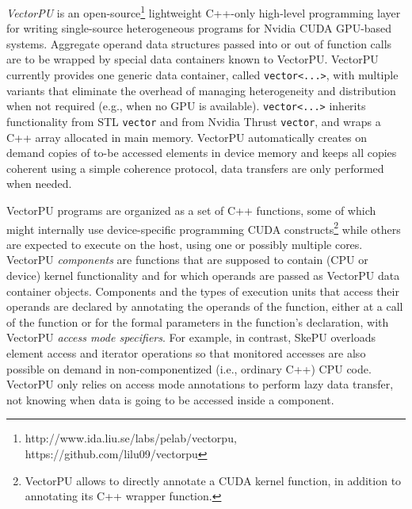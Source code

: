 \textit{VectorPU} \cite{VectorPU-2017} is an open-source\footnote{http://www.ida.liu.se/labs/pelab/vectorpu, https://github.com/lilu09/vectorpu} lightweight C++-only 
high-level programming layer
for writing single-source heterogeneous programs for Nvidia CUDA GPU-based systems.
Aggregate operand data structures 
passed into or out of  function calls are
to be wrapped by special data containers known to VectorPU.
VectorPU currently provides one generic data container,
called \verb+vector<...>+,
with multiple variants that 
eliminate the overhead of managing heterogeneity and distribution when not required (e.g., when no GPU is available). 
\verb+vector<...>+ inherits functionality from STL \verb.vector. 
and from Nvidia Thrust \verb.vector., and
wraps a C++ array allocated in main memory. 
VectorPU automatically creates on demand
copies of to-be accessed elements in device memory and keeps all copies coherent using
a simple coherence protocol, data transfers are only performed when needed. 

VectorPU programs are organized as a set of C++ functions, some of which
might internally use device-specific programming CUDA constructs\footnote{%
VectorPU allows to directly annotate a CUDA kernel function, in addition to annotating its C++ wrapper function.} while others
are expected to execute on the host, using one or possibly multiple cores.
VectorPU \emph{components} are functions that are supposed to contain (CPU or device)
kernel functionality and for which  operands are passed as VectorPU data container objects. 
Components and the types of execution units that
access their operands are declared 
by annotating the operands of the function, either at a call of the function
or for the formal parameters in the function's declaration, 
with VectorPU \emph{access mode specifiers}. For example, in contrast,  SkePU \cite{Enmyren10}  overloads element
access and iterator operations so that monitored 
accesses are also possible on demand in non-componentized (i.e., 
ordinary C++) CPU code.
VectorPU only relies on access mode annotations 
to perform lazy data transfer,
not knowing when data is going to be accessed inside a component.

